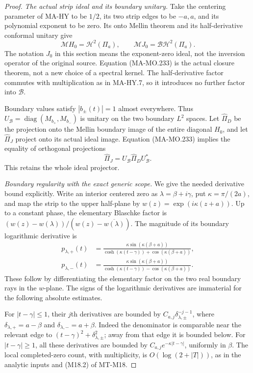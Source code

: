 \begin{proof}
\emph{The actual strip ideal and its boundary unitary.}
Take the centering parameter of MA-HY to be \(1/2\), its
two strip edges to be \(-a,a\), and its polynomial exponent
to be zero.  Its onto Mellin theorem and its half-derivative
conformal unitary give
\[
 \mathcal M H_0=\mathscr H^2(\Pi_a),\qquad
 \mathcal M J_0=\mathcal B\mathscr H^2(\Pi_a).
 \tag{MA-MO.233}
\]
The notation \(J_0\) in this section means the exponent-zero
ideal, not the inversion operator of the original source.
Equation (MA-MO.233) is the actual closure theorem, not a
new choice of a spectral kernel.  The half-derivative factor
commutes with multiplication as in MA-HY.7, so it introduces
no further factor into \(\mathcal B\).

Boundary values satisfy \(|b_\pm(t)|=1\) almost everywhere.
Thus \(U_{\mathcal B}=\operatorname{diag}(M_{b_+},M_{b_-})\)
is unitary on the two boundary \(L^2\) spaces.  Let
\(\widehat\Pi_D\) be the projection onto the Mellin boundary
image of the entire diagonal \(H_0\), and let
\(\widehat\Pi_J\) project onto its actual ideal image.
Equation (MA-MO.233) implies the equality of orthogonal
projections
\[
          \widehat\Pi_J
            =U_{\mathcal B}\widehat\Pi_D U_{\mathcal B}^*.
 \tag{MA-MO.234}
\]
This retains the whole ideal projector.

\emph{Boundary regularity with the exact generic scope.}
We give the needed derivative bound explicitly.  Write an
interior centered zero as \(\lambda=\beta+i\gamma\), put
\(\kappa=\pi/(2a)\), and map the strip to the upper half-plane
by \(w(z)=\exp(i\kappa(z+a))\).  Up to a constant phase,
the elementary Blaschke factor is
\((w(z)-w(\lambda))/(w(z)-\overline{w(\lambda)})\).
The magnitude of its boundary logarithmic derivative is
\[
 \begin{aligned}
 p_{\lambda,+}(t)
    &=\frac{\kappa\sin(\kappa(\beta+a))}
        {\cosh(\kappa(t-\gamma))+
                              \cos(\kappa(\beta+a))},\\
 p_{\lambda,-}(t)
    &=\frac{\kappa\sin(\kappa(\beta+a))}
        {\cosh(\kappa(t-\gamma))-
                              \cos(\kappa(\beta+a))}.
 \end{aligned}
 \tag{MA-MO.235}
\]
These follow by differentiating the elementary factor on
the two real boundary rays in the \(w\)-plane.  The signs
of the logarithmic derivatives are immaterial for the
following absolute estimates.

For \(|t-\gamma|\le1\), their \(j\)th derivatives are
bounded by \(C_{a,j}\delta_{\lambda,\pm}^{-j-1}\), where
\(\delta_{\lambda,+}=a-\beta\) and
\(\delta_{\lambda,-}=a+\beta\).  Indeed the denominator
is comparable near the relevant edge to
\((t-\gamma)^2+\delta_{\lambda,\pm}^2\); away from that
edge it is bounded below.  For \(|t-\gamma|\ge1\), all
these derivatives are bounded by
\(C_{a,j}e^{-\kappa|t-\gamma|}\), uniformly in \(\beta\).
The local completed-zero count, with multiplicity, is
\(O(\log(2+|T|))\), as in the analytic inputs and
(M18.2) of MT-M18.


\end{proof}
